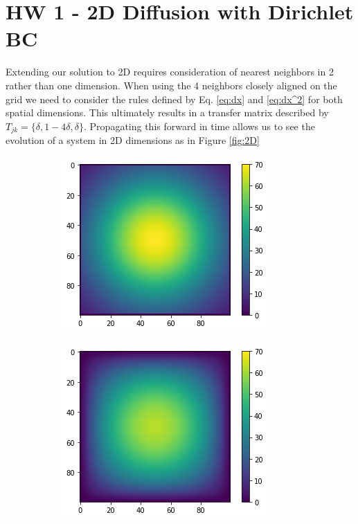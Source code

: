 \documentclass[]{article}
\begin{document}
\section{HW 1 - 2D Diffusion with Dirichlet BC}
Extending our solution to 2D requires consideration of nearest neighbors in 2 rather than one dimension.  When using the 4 neighbors closely aligned on the grid we need to consider the rules defined by Eq. \ref{eq:dx} and \ref{eq:dx^2} for both spatial dimensions. This ultimately results in a transfer matrix described by $T_{jk} = \{\delta,1-4\delta,\delta\}$. Propagating this forward in time allows us to see the evolution of a system in 2D dimensions as in Figure \ref{fig:2D}
\begin{figure}
	\begin{subfigure}{.5\textwidth}
		\centering
		\includegraphics[width=.8\linewidth]{figures/2D_Diffusion_DirBound0_init.png}
		\caption{}
	\end{subfigure}%
	\begin{subfigure}{.5\textwidth}
		\centering
		\includegraphics[width=.8\linewidth]{figures/2D_Diffusion_DirBound0_end.png}

\end{subfigure}
\end{figure}
\end{document}
